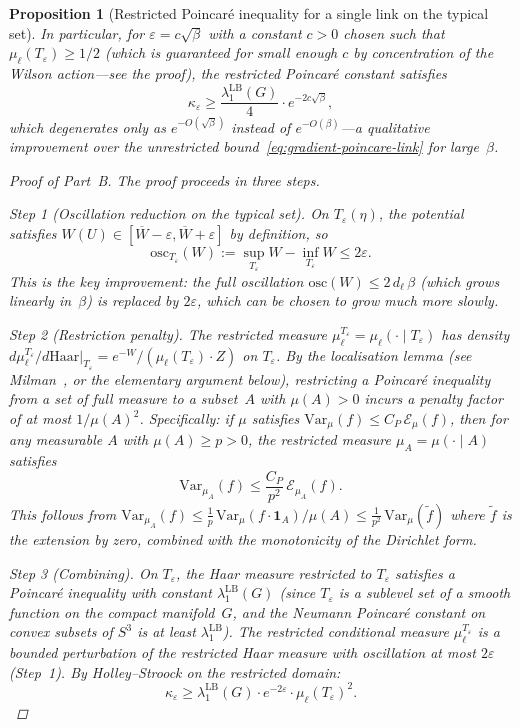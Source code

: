 \documentclass[12pt,a4paper]{article}
\theoremstyle{definition}
\theoremstyle{plain}
\newtheorem{proposition}[definition]{Proposition}
\theoremstyle{remark}
\begin{document}
\begin{proposition}[Restricted Poincar\'e inequality for a single link on the typical set]
In particular, for $\varepsilon = c\sqrt{\beta}$ with a constant $c > 0$ chosen such that $\mu_\ell(T_\varepsilon) \geq 1/2$ (which is guaranteed for small enough $c$ by concentration of the Wilson action---see the proof), the restricted Poincar\'e constant satisfies
\begin{equation}\label{eq:restricted-constant-explicit}
    \kappa_\varepsilon \geq \frac{\lambda_1^{\mathrm{LB}}(G)}{4}\cdot e^{-2c\sqrt{\beta}},
\end{equation}
which degenerates only as $e^{-O(\sqrt{\beta})}$ instead of $e^{-O(\beta)}$---a qualitative improvement over the unrestricted bound~\eqref{eq:gradient-poincare-link} for large~$\beta$.

\begin{proof}[Proof of Part~B]
The proof proceeds in three steps.

\emph{Step 1 (Oscillation reduction on the typical set).}
On $T_\varepsilon(\eta)$, the potential satisfies $W(U) \in [\overline{W} - \varepsilon, \overline{W} + \varepsilon]$ by definition, so
\[
    \mathrm{osc}_{T_\varepsilon}(W) := \sup_{T_\varepsilon} W - \inf_{T_\varepsilon} W \leq 2\varepsilon.
\]
This is the key improvement: the full oscillation $\mathrm{osc}(W) \leq 2\,d_\ell\,\beta$ (which grows linearly in~$\beta$) is replaced by $2\varepsilon$, which can be chosen to grow much more slowly.

\emph{Step 2 (Restriction penalty).}
The restricted measure $\mu_\ell^{T_\varepsilon} = \mu_\ell(\cdot \mid T_\varepsilon)$ has density $d\mu_\ell^{T_\varepsilon}/d\mathrm{Haar}|_{T_\varepsilon} = e^{-W}/(\mu_\ell(T_\varepsilon) \cdot Z)$ on $T_\varepsilon$. By the localisation lemma (see Milman~\cite{Milman2009}, or the elementary argument below), restricting a Poincar\'e inequality from a set of full measure to a subset~$A$ with $\mu(A) > 0$ incurs a penalty factor of at most $1/\mu(A)^2$. Specifically: if $\mu$ satisfies $\mathrm{Var}_\mu(f) \leq C_P\,\mathcal{E}_\mu(f)$, then for any measurable $A$ with $\mu(A) \geq p > 0$, the restricted measure $\mu_A = \mu(\cdot \mid A)$ satisfies
\[
    \mathrm{Var}_{\mu_A}(f) \leq \frac{C_P}{p^2}\,\mathcal{E}_{\mu_A}(f).
\]
This follows from $\mathrm{Var}_{\mu_A}(f) \leq \frac{1}{p}\,\mathrm{Var}_\mu(f\cdot\mathbf{1}_A)/\mu(A) \leq \frac{1}{p^2}\,\mathrm{Var}_\mu(\tilde{f})$ where $\tilde{f}$ is the extension by zero, combined with the monotonicity of the Dirichlet form.

\emph{Step 3 (Combining).}
On $T_\varepsilon$, the Haar measure restricted to $T_\varepsilon$ satisfies a Poincar\'e inequality with constant $\lambda_1^{\mathrm{LB}}(G)$ (since $T_\varepsilon$ is a sublevel set of a smooth function on the compact manifold~$G$, and the Neumann Poincar\'e constant on convex subsets of $S^3$ is at least $\lambda_1^{\mathrm{LB}}$). The restricted conditional measure $\mu_\ell^{T_\varepsilon}$ is a bounded perturbation of the restricted Haar measure with oscillation at most $2\varepsilon$ (Step~1). By Holley--Stroock on the restricted domain:
\[
    \kappa_\varepsilon \geq \lambda_1^{\mathrm{LB}}(G) \cdot e^{-2\varepsilon} \cdot \mu_\ell(T_\varepsilon)^2.
\]


\end{proof}
\end{proposition}
\end{document}
